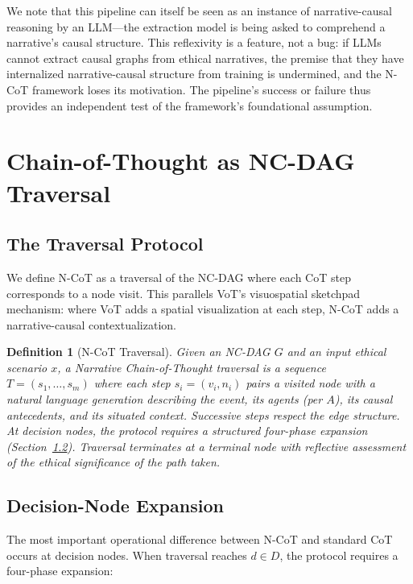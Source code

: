 \documentclass[11pt,letterpaper]{article}
\theoremstyle{defn}
\newtheorem{definition}{Definition}
\begin{document}
We note that this pipeline can itself be seen as an instance of narrative-causal reasoning by an LLM---the extraction model is being asked to comprehend a narrative's causal structure. This reflexivity is a feature, not a bug: if LLMs cannot extract causal graphs from ethical narratives, the premise that they have internalized narrative-causal structure from training is undermined, and the N-CoT framework loses its motivation. The pipeline's success or failure thus provides an independent test of the framework's foundational assumption.

\section{Chain-of-Thought as NC-DAG Traversal}

\subsection{The Traversal Protocol}

We define N-CoT as a traversal of the NC-DAG where each CoT step corresponds to a node visit. This parallels VoT's visuospatial sketchpad mechanism: where VoT adds a spatial visualization at each step, N-CoT adds a narrative-causal contextualization.

\begin{definition}[N-CoT Traversal]
Given an NC-DAG $G$ and an input ethical scenario $x$, a Narrative Chain-of-Thought traversal is a sequence $T = (s_1, \ldots, s_m)$ where each step $s_i = (v_i, n_i)$ pairs a visited node with a natural language generation describing the event, its agents (per $A$), its causal antecedents, and its situated context. Successive steps respect the edge structure. At decision nodes, the protocol requires a structured four-phase expansion (Section~\ref{sec:decision-expansion}). Traversal terminates at a terminal node with reflective assessment of the ethical significance of the path taken.
\end{definition}

\subsection{Decision-Node Expansion}
\label{sec:decision-expansion}

The most important operational difference between N-CoT and standard CoT occurs at decision nodes. When traversal reaches $d \in D$, the protocol requires a four-phase expansion:
\end{document}
